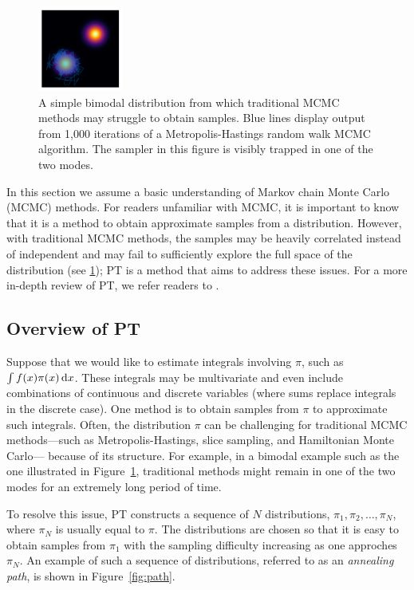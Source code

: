 \begin{figure}[t]
    \centering
    \includegraphics[width=0.25\textwidth]{../img/bimodal.pdf}
    \caption{A simple bimodal distribution from which traditional 
    MCMC methods may struggle to obtain samples. Blue lines display output 
    from 1,000 iterations of a Metropolis-Hastings random walk MCMC algorithm.
    The sampler in this figure is visibly trapped in one of the two modes.}
    \label{fig:bimodal}
\end{figure}


In this section we assume a basic understanding of 
Markov chain Monte Carlo (MCMC) methods.
For readers unfamiliar with MCMC, it is important to know that 
it is a method to obtain approximate samples from a distribution. 
However, with traditional 
MCMC methods, the samples may be heavily correlated instead of independent 
and may fail to sufficiently explore the 
full space of the distribution (see \cref{fig:bimodal}); 
PT is a method that aims to address these issues.
For a more in-depth review of PT, we refer readers to \cite{surjanovic2022vpt}.


\subsection{Overview of PT}
Suppose that we would like to estimate integrals involving $\pi$, such as 
$\int f(x) \pi(x) \, \mathrm{d} x$. 
These integrals may be multivariate and even include combinations of 
continuous and discrete variables (where sums replace integrals in the discrete 
case).
One method is to obtain samples from $\pi$ to approximate such integrals.
Often, the distribution 
$\pi$ can be challenging for traditional MCMC methods---such 
as Metropolis-Hastings, slice sampling, and Hamiltonian Monte Carlo---
because of its structure.
For example, in a bimodal example such as the one illustrated in 
Figure~\ref{fig:bimodal},
traditional methods might remain in one of the two modes for an extremely 
long period of time.



To resolve this issue, PT constructs a sequence of $N$ distributions,  
$\pi_1, \pi_2, \ldots, \pi_N$, where $\pi_N$ is usually equal to $\pi$.
The distributions are chosen so that it is easy to obtain samples from $\pi_1$
with the sampling difficulty increasing as one approches $\pi_N$. An example 
of such a sequence of distributions, referred to as an \textit{annealing path},
is shown in Figure~\ref{fig:path}.



